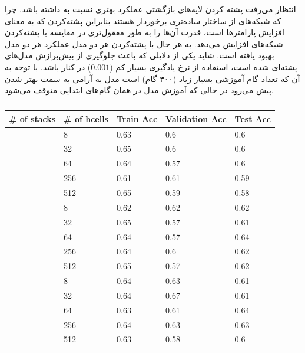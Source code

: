 \documentclass[12pt, a4paper]{book}
\begin{document}
انتظار می‌رفت پشته‌ کردن لایه‌های بازگشتی  عملکرد بهتری نسبت به  داشته باشد.
چرا که شبکه‌های  از ساختار ساده‌تری برخوردار هستند بنابراین پشته‌کردن که به معنای افزایش پارامتر‌ها است،
قدرت‌ آن‌ها را به طور معقول‌تری در مقایسه با پشته‌کردن شبکه‌های  افزایش می‌دهد. به هر حال با پشته‌کردن هر دو مدل
عملکرد هر دو مدل بهبود یافته است. شاید یکی از دلایلی که باعث جلوگیری از بیش‌برازش مدل‌های پشته‌ای 
شده است، استفاده از نرخ یادگیری بسیار کم ($0.001$) در کنار  باشد. با توجه به آن که
تعداد گام آموزشی بسیار زیاد (۳۰۰ گام) است مدل  به آرامی به سمت بهتر شدن پیش می‌رود در حالی که آموزش مدل
 در همان گام‌های ابتدایی متوقف می‌شود.

\begin{latin}
    \begin{table}[h]
    \centering
    \caption{}
    \label{lstm_stacked_layer}
    \begin{tabular}{c|l|l|l|l}
        \rowcolor{teal!50}
        \# of stacks & \# of hcells & Train Acc & Validation Acc & Test Acc \\
        \hline
        \rowcolor{teal!10}
        & 8 & 0.63 & 0.6 & 0.6\\ \rowcolor{teal!10}
        & 32 & 0.65 & 0.6 & 0.6\\ \rowcolor{teal!10}
        & 64 & 0.64 & 0.57 & 0.6 \\ \rowcolor{teal!10}
        & 256 & 0.61 & 0.61 & 0.59 \\ \rowcolor{teal!10}
        \multirow{-5}{*}{2} & 512 & 0.65 & 0.59 & 0.58 \\ \rowcolor{teal!40} \hline
        & 8 & 0.62 & 0.62 & 0.62 \\ \rowcolor{teal!40}
        & 32 & 0.65 & 0.57 & 0.61\\ \rowcolor{teal!40}
        & 64 & 0.64 & 0.57 & 0.64 \\ \rowcolor{teal!40}
        & 256 & 0.64 & 0.6 & 0.62 \\ \rowcolor{teal!40}
        \multirow{-5}{*}{3} & 512 & 0.65 & 0.57 & 0.62\\ \rowcolor{teal!10} \hline
        & 8 & 0.64 & 0.63 & 0.61\\ \rowcolor{teal!10}
        & 32 & 0.64 & 0.67 & 0.61 \\ \rowcolor{teal!10}
        & 64 & 0.63 & 0.61 & 0.64 \\ \rowcolor{teal!10}
        & 256 & 0.64 & 0.63 & 0.63 \\ \rowcolor{teal!10}
        \multirow{-5}{*}{4} & 512 & 0.63 & 0.58 & 0.6 \\
    \end{tabular}
    \end{table}
\end{latin}
\end{document}
